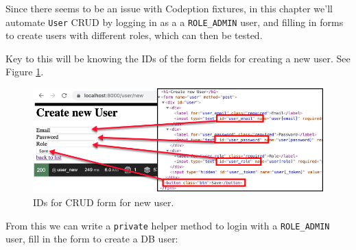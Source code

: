 \documentclass[a4paperpaper,openright]{book}
\newenvironment{Shaded}{}{}
\newcommand{\KeywordTok}[1]{\textcolor[rgb]{0.00,0.44,0.13}{\textbf{#1}}}
\newcommand{\NormalTok}[1]{#1}
\newcommand{\OtherTok}[1]{\textcolor[rgb]{0.00,0.44,0.13}{#1}}
\newcommand{\StringTok}[1]{\textcolor[rgb]{0.25,0.44,0.63}{#1}}
\begin{document}
Since there seems to be an issue with Codeption fixtures, in this
chapter we'll automate \texttt{User} CRUD by logging in as a a
\texttt{ROLE\_ADMIN} user, and filling in forms to create users with
different roles, which can then be tested.

Key to this will be knowing the IDs of the form fields for creating a
new user. See Figure \ref{userFormIds}.

\begin{figure}
\centering
\includegraphics{./tex2pdf.-8aed53dcd332a606/f9bb64b599a83634a12f2e664a4385ae995bcf09.png}
\caption{IDs for CRUD form for new user. \label{userFormIds}}
\end{figure}

From this we can write a \texttt{private} helper method to login with a
\texttt{ROLE\_ADMIN} user, fill in the form to create a DB user:

\begin{Shaded}
\end{Shaded}
\end{document}
